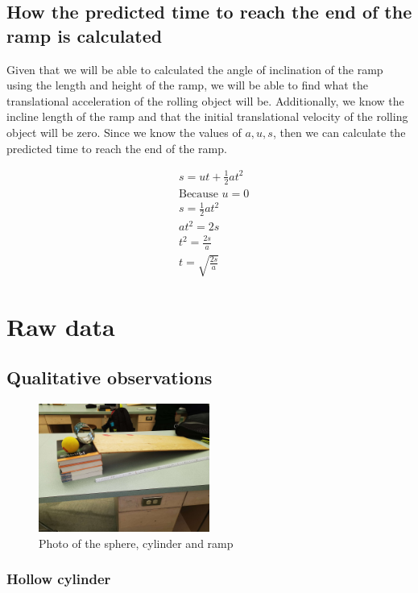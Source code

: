 \documentclass[letterpaper, 12pt]{article}
\begin{document}
\subsection{How the predicted time to reach the end of the ramp is calculated}

Given that we will be able to calculated the angle of inclination of the ramp using
the length and height of the ramp, we will be able to find what the translational
acceleration of the rolling object will be. Additionally, we know the incline
length of the ramp and that the initial translational velocity of the rolling object
will be zero. Since we know the values of $a, u, s$, then we can calculate the
predicted time to reach the end of the ramp.

\begin{align*}
     & s = ut + \frac{1}{2}at^2
    \\
     & \text{Because } u = 0
    \\
     & s = \frac{1}{2}at^2
    \\
     & at^2 = 2s
    \\
     & t^2 = \frac{2s}{a}
    \\
     & t = \sqrt{\frac{2s}{a}}
\end{align*}

\section{Raw data}

\subsection{Qualitative observations}

\begin{figure}[H]
    \centering
    \includegraphics[width=0.5\textwidth]{apparatus}
    \caption{Photo of the sphere, cylinder and ramp}
    \label{fig:apparatus}
\end{figure}

\subsubsection{Hollow cylinder}
\end{document}

